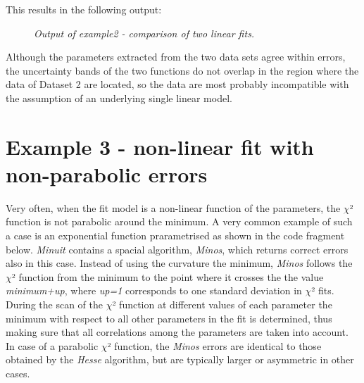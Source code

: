 \documentclass[a4paper,10pt,english]{sphinxmanual}
\begin{document}
This results in the following output:
\begin{figure}[htbp]
\centering
\capstart

\caption{\emph{Output of example2 - comparison of two linear fits.}}\end{figure}

Although the parameters extracted from the two data sets agree within
errors, the uncertainty bands of the two functions do not overlap
in the region where the data of Dataset 2 are located, so the data
are most probably incompatible with the assumption of an underlying
single linear model.


\section{Example 3 - non-linear fit with non-parabolic errors}
\label{index:example-3-non-linear-fit-with-non-parabolic-errors}
Very often, when the fit model is a non-linear function
of the parameters, the \(\chi\)² function is not parabolic around
the minimum. A very common example of such a case is an
exponential function prarametrised as shown in the code
fragment below. \emph{Minuit} contains a spacial algorithm, \emph{Minos},
which returns correct errors also in this case. Instead of
using the curvature the minimum, \emph{Minos} follows the
\(\chi\)² function from the minimum to the point where it
crosses the the value \emph{minimum+up}, where \emph{up=1} corresponds
to one standard deviation in \(\chi\)² fits. During the scan of the
\(\chi\)² function at different values of each parameter the minimum
with respect to all other parameters in the fit is determined,
thus making sure that all correlations among the parameters
are taken into account. In case of a parabolic \(\chi\)² function,
the \emph{Minos} errors are identical to those obtained by
the \emph{Hesse} algorithm, but are typically larger or
asymmetric in other cases.
\end{document}

